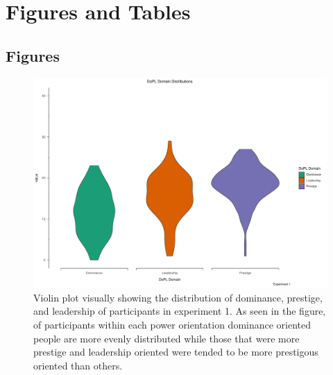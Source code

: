 \documentclass[
  donotrepeattitle,doc, 12pt, a4paper,floatsintext]{apa7}
\begin{document}
\endgroup

\newpage

\hypertarget{figures-and-tables}{%
\section{Figures and Tables}\label{figures-and-tables}}

\hypertarget{figures}{%
\subsection{Figures}\label{figures}}

\begin{figure}
\centering
\includegraphics{Output_Files/DoPL-Experiment_files/figure-latex/DoPL-Experiment-1-1.pdf}
\caption{\label{fig:DoPL-Experiment-1}Violin plot visually showing the distribution of dominance, prestige, and leadership of participants in experiment 1. As seen in the figure, of participants within each power orientation dominance oriented people are more evenly distributed while those that were more prestige and leadership oriented were tended to be more prestigous oriented than others.}
\end{figure}
\end{document}
